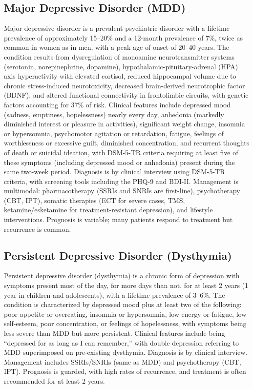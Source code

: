 \subsection{Major Depressive Disorder (MDD)}
\label{sec:Major Depressive Disorder (MDD)}
Major depressive disorder is a prevalent psychiatric disorder with a lifetime prevalence of approximately 15--20\% and a 12-month prevalence of 7\%, twice as common in women as in men, with a peak age of onset of 20--40 years. The condition results from dysregulation of monoamine neurotransmitter systems (serotonin, norepinephrine, dopamine), hypothalamic-pituitary-adrenal (HPA) axis hyperactivity with elevated cortisol, reduced hippocampal volume due to chronic stress-induced neurotoxicity, decreased brain-derived neurotrophic factor (BDNF), and altered functional connectivity in frontolimbic circuits, with genetic factors accounting for 37\% of risk. Clinical features include depressed mood (sadness, emptiness, hopelessness) nearly every day, anhedonia (markedly diminished interest or pleasure in activities), significant weight change, insomnia or hypersomnia, psychomotor agitation or retardation, fatigue, feelings of worthlessness or excessive guilt, diminished concentration, and recurrent thoughts of death or suicidal ideation, with DSM-5-TR criteria requiring at least five of these symptoms (including depressed mood or anhedonia) present during the same two-week period. Diagnosis is by clinical interview using DSM-5-TR criteria, with screening tools including the PHQ-9 and BDI-II. Management is multimodal: pharmacotherapy (SSRIs and SNRIs are first-line), psychotherapy (CBT, IPT), somatic therapies (ECT for severe cases, TMS, ketamine/esketamine for treatment-resistant depression), and lifestyle interventions. Prognosis is variable; many patients respond to treatment but recurrence is common.

\subsection{Persistent Depressive Disorder (Dysthymia)}
\label{sec:Persistent Depressive Disorder (Dysthymia)}
Persistent depressive disorder (dysthymia) is a chronic form of depression with symptoms present most of the day, for more days than not, for at least 2 years (1 year in children and adolescents), with a lifetime prevalence of 3--6\%. The condition is characterized by depressed mood plus at least two of the following: poor appetite or overeating, insomnia or hypersomnia, low energy or fatigue, low self-esteem, poor concentration, or feelings of hopelessness, with symptoms being less severe than MDD but more persistent. Clinical features include being ``depressed for as long as I can remember,'' with double depression referring to MDD superimposed on pre-existing dysthymia. Diagnosis is by clinical interview. Management includes SSRIs/SNRIs (same as MDD) and psychotherapy (CBT, IPT). Prognosis is guarded, with high rates of recurrence, and treatment is often recommended for at least 2 years.

